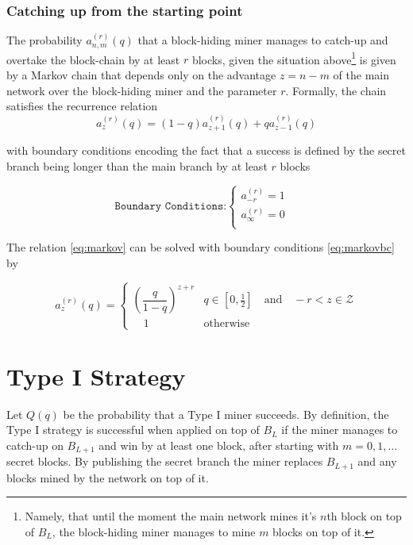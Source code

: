 \documentclass[letterpaper,12pt]{report}
\begin{document}
\subsection{Catching up from the starting point}
The probability $\mathit{a}_{n,m}^{(r)}(q)$ that a block-hiding miner manages to catch-up and overtake the block-chain by at least $r$ blocks, given the situation above\footnote{Namely, that until the moment the main network mines it's $n$th block on top of $\mathit{B}_L$, the block-hiding miner manages to mine $m$ blocks on top of it.} is given by a Markov chain that depends only on the advantage $z=n-m$ of the main network over the block-hiding miner and the parameter $r$. Formally, the chain satisfies the recurrence relation
\begin{equation}\label{eq:markov}
\mathit{a}^{(r)}_z(q)=(1-q)\mathit{a}^{(r)}_{z+1}(q)+q\mathit{a}^{(r)}_{z-1}(q)
\end{equation}

with boundary conditions encoding the fact that a success is defined by the secret branch being longer than the main branch by at least $r$ blocks

\begin{equation}\label{eq:markovbc}
\texttt{Boundary Conditions:}
\begin{cases}
\mathit{a}^{(r)}_{-r}=1 & \\ 
\mathit{a}^{(r)}_{\infty}=0 & \\
\end{cases}
\end{equation}

The relation \ref{eq:markov} can be solved with boundary conditions \ref{eq:markovbc} by 

\begin{equation}\label{eq:az}
\mathit{a}^{(r)}_z(q)=\begin{cases}\left( \dfrac{q}{1-q}\right)^{z+r} & q\in [0,\frac{1}{2}] \quad \mathrm{and} \quad  -r<z\in\mathcal{Z} \\ \quad 1 & \mathrm{otherwise} \end{cases}
\end{equation}




\chapter{Type I Strategy}

Let $\mathit{Q}(q)$ be the probability that a Type I miner succeeds. By definition, the Type I strategy is successful when applied on top of $\mathit{B}_L$ if the miner manages to catch-up on $B_{L+1}$ and win by at least one block, after starting with $m=0,1,\dots$ secret blocks. 
By publishing the secret branch the miner replaces $\mathit{B}_{L+1}$ and any blocks mined by the network on top of it. 
\end{document}
